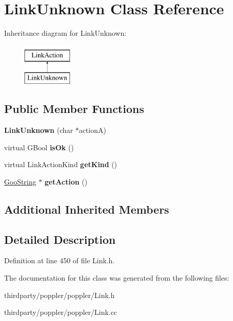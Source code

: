 \hypertarget{class_link_unknown}{}\section{Link\+Unknown Class Reference}
\label{class_link_unknown}
Inheritance diagram for Link\+Unknown\+:\begin{figure}[H]
\begin{center}
\leavevmode
\includegraphics[height=2.000000cm]{class_link_unknown}
\end{center}
\end{figure}
\subsection*{Public Member Functions}
\begin{DoxyCompactItemize}
\item 
\mbox{\label{class_link_unknown_a60201db515e0cddc1660170c9fc15d28}} 
{\bfseries Link\+Unknown} (char $\ast$actionA)
\item 
\mbox{\label{class_link_unknown_a0a02bc18880324651edad0bf2d330a32}} 
virtual G\+Bool {\bfseries is\+Ok} ()
\item 
\mbox{\label{class_link_unknown_a513ffefb4538d81fdf4dfd4ba8578f3c}} 
virtual Link\+Action\+Kind {\bfseries get\+Kind} ()
\item 
\mbox{\label{class_link_unknown_a005a1766d210dedb42cbedc2a68d6a33}} 
\hyperlink{class_goo_string}{Goo\+String} $\ast$ {\bfseries get\+Action} ()
\end{DoxyCompactItemize}
\subsection*{Additional Inherited Members}


\subsection{Detailed Description}


Definition at line 450 of file Link.\+h.



The documentation for this class was generated from the following files\+:\begin{DoxyCompactItemize}
\item 
thirdparty/poppler/poppler/Link.\+h\item 
thirdparty/poppler/poppler/Link.\+cc\end{DoxyCompactItemize}
